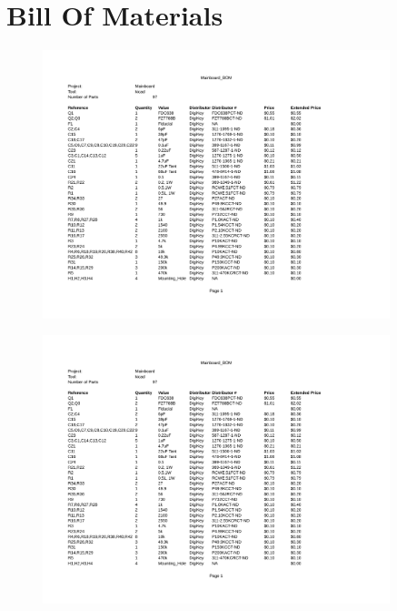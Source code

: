 \documentclass{article}
\numberwithin{figure}{section}
\numberwithin{equation}{section}
\begin{document}
{\newpage
\section{Bill Of Materials} \label{sect:appendixB}
\begin{figure}[H]
	\centering
	\includegraphics[page=1,width=0.9\textwidth]{Mainboard_BOM.pdf}
	\caption{}
	\label{fig:mainbom1}
\end{figure}
\begin{figure}[H]
	\centering
	\includegraphics[page=2,width=0.9\textwidth]{Mainboard_BOM.pdf}
	\caption{}
	\label{fig:mainbom1}
\end{figure}
\begin{figure}[H]
	\centering

\end{figure}}
\end{document}

